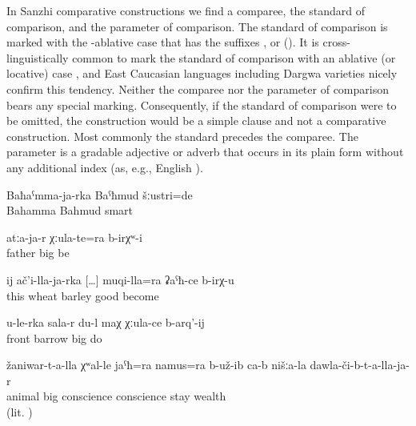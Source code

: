 In Sanzhi comparative constructions we find a comparee, the standard of comparison, and the parameter of comparison. The standard of comparison is marked with the -ablative case that has the suffixes ,  or  (). It is cross-linguistically common to mark the standard of comparison with an ablative (or locative) case \citep[791]{Dixon2008}, and East Caucasian languages including Dargwa varieties nicely confirm this tendency. Neither the comparee nor the parameter of comparison bears any special marking. Consequently, if the standard of comparison were to be omitted, the construction would be a simple clause and not a comparative construction. Most commonly the standard precedes the comparee. The parameter is a gradable adjective or adverb that occurs in its plain form without any additional index (as, e.g., English ).
%
\begin{exe}
	\ex	\label{ex:‎Bahmud was smarter than Bahamma}
	\gll	Baħaˁmma-ja-rka	Baˁħmud	šːustri=de	\\
		Bahamma	Bahmud	smart\\
	\glt	{}

	\ex	\label{ex:‎‎There were those older than father}
	\gll	atːa-ja-r	χːula-te=ra	b-irχʷ-i\\
		father	big be\\
	\glt	{}

	\ex	\label{ex:‎‎It (bread) is better (when made) of barley than of wheat.}
	\gll	ij	ač'i-lla-ja-rka	[\ldots]	muqi-lla=ra	ʡaˁħ-ce	b-irχ-u	\\
		this	wheat	{} barley	good	become\\
	\glt	{}

	\ex	\label{ex:‎I (will) make a big barrow (maχ) earlier than you}
	\gll	u-le-rka	sala-r	du-l	maχ	χːula-ce	b-arq'-ij\\
			front		barrow	big	do	\\
	\glt	{}

	\ex	\label{ex:‎‎‎The animals had apparently more conscience than our rich (people)}
	\gll	žaniwar-t-a-lla	χʷal-le	jaˁħ=ra		namus=ra	b-už-ib	ca-b	nišːa-la	dawla-či-b-t-a-lla-ja-r	\\
		animal	big	conscience	conscience	stay			wealth\\
	\glt	{} (lit. )
\end{exe}


